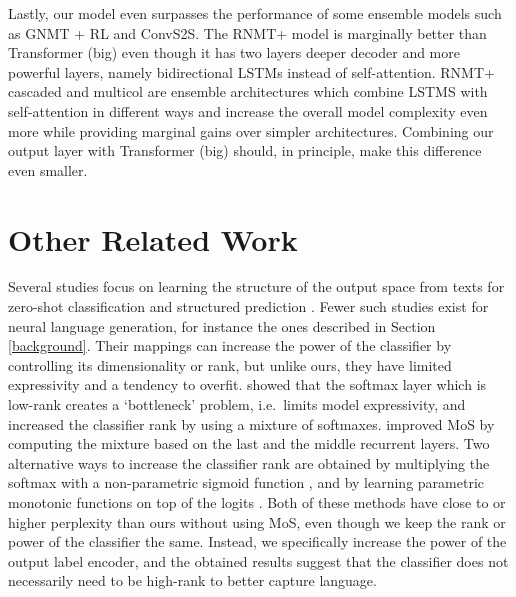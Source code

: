 \documentclass{article}
\begin{document}
Lastly, our model even surpasses the performance of some ensemble models such as GNMT + RL and ConvS2S. The RNMT+ model is marginally better than Transformer (big) even though it has two layers deeper decoder and more powerful layers, namely bidirectional LSTMs instead of self-attention. RNMT+ cascaded and multicol are ensemble architectures which combine LSTMS with self-attention in different ways and increase the overall model complexity even more while providing marginal gains over simpler architectures. Combining our output layer with Transformer (big) should, in principle, make this difference even smaller.


\section{Other Related Work}
Several studies focus on learning the structure of the output space from texts for zero-shot classification \cite{dauphin14,nam16,rios-kavuluru-2018-shot,pappas19b} and structured prediction \cite{Srikumar14,dyer2015,YehWKW17}. Fewer such studies exist for neural language generation, for instance the ones described in Section \ref{background}. Their mappings can increase the power of the classifier by controlling its dimensionality or rank, but unlike ours, they have limited expressivity and a tendency to overfit. \citet{mos2018} showed that the softmax layer which is low-rank creates a `bottleneck' problem, i.e.~limits model expressivity, and increased the classifier rank by using a mixture of softmaxes. \citet{takase18} improved MoS by computing the mixture based on the last and the middle recurrent layers. Two alternative ways to increase the classifier rank are obtained by  multiplying the softmax with a non-parametric sigmoid function \cite{NIPS2018_7312}, and by learning parametric monotonic functions on top of the logits \cite{ganea}. Both of these methods have close to or higher perplexity than ours without using MoS, even though we keep the rank or power of the classifier the same. Instead, we specifically increase the power of the output label encoder, and the obtained results suggest that the classifier does not necessarily need to be high-rank to better capture language. 
\end{document}
